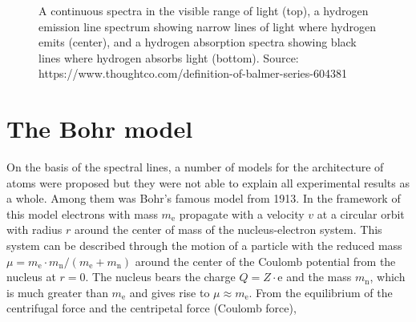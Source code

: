 \documentclass[
  a4paper,
]{book}
\begin{document}
\begin{figure}


\caption{\label{fig-hydrogen-lines}A continuous spectra in the visible
range of light (top), a hydrogen emission line spectrum showing narrow
lines of light where hydrogen emits (center), and a hydrogen absorption
spectra showing black lines where hydrogen absorbs light (bottom).
Source: https://www.thoughtco.com/definition-of-balmer-series-604381}

\end{figure}%

\section{The Bohr model}\label{the-bohr-model}

On the basis of the spectral lines, a number of models for the
architecture of atoms were proposed but they were not able to explain
all experimental results as a whole. Among them was Bohr's famous model
from 1913. In the framework of this model electrons with mass
\(m_{\mathrm{e}}\) propagate with a velocity \(v\) at a circular orbit
with radius \(r\) around the center of mass of the nucleus-electron
system. This system can be described through the motion of a particle
with the reduced mass
\(\mu = m_{\mathrm{e}} \cdot m_{\mathrm{n}} / \left( m_{\mathrm{e}} + m_{\mathrm{n}} \right)\)
around the center of the Coulomb potential from the nucleus at
\(r = 0\). The nucleus bears the charge \(Q = Z \cdot \mathrm{e}\) and
the mass \(m_{\mathrm{n}}\), which is much greater than
\(m_{\mathrm{e}}\) and gives rise to \(\mu \approx m_{\mathrm{e}}\).
From the equilibrium of the centrifugal force and the centripetal force
(Coulomb force),
\end{document}
